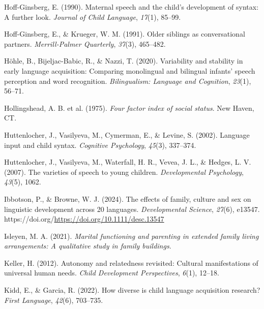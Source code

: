\documentclass[
  man,floatsintext]{apa6}
\newlength{\cslhangindent}
\newenvironment{CSLReferences}[2] %
 {\begin{list}{}{%
  \setlength{\itemindent}{0pt}
  \setlength{\leftmargin}{0pt}
  \setlength{\parsep}{0pt}
  \ifodd #1
   \setlength{\leftmargin}{\cslhangindent}
   \setlength{\itemindent}{-1\cslhangindent}
  \fi
  \setlength{\itemsep}{#2\baselineskip}}}
 {\end{list}}
\begin{document}
\begin{CSLReferences}{1}{0}
Hoff-Ginsberg, E. (1990). Maternal speech and the child's development of syntax: A further look. \emph{Journal of Child Language}, \emph{17}(1), 85--99.

Hoff-Ginsberg, E., \& Krueger, W. M. (1991). Older siblings as conversational partners. \emph{Merrill-Palmer Quarterly}, \emph{37}(3), 465--482.

Höhle, B., Bijeljac-Babic, R., \& Nazzi, T. (2020). Variability and stability in early language acquisition: Comparing monolingual and bilingual infants' speech perception and word recognition. \emph{Bilingualism: Language and Cognition}, \emph{23}(1), 56--71.

Hollingshead, A. B. et al. (1975). \emph{Four factor index of social status}. New Haven, CT.

Huttenlocher, J., Vasilyeva, M., Cymerman, E., \& Levine, S. (2002). Language input and child syntax. \emph{Cognitive Psychology}, \emph{45}(3), 337--374.

Huttenlocher, J., Vasilyeva, M., Waterfall, H. R., Vevea, J. L., \& Hedges, L. V. (2007). The varieties of speech to young children. \emph{Developmental Psychology}, \emph{43}(5), 1062.

Ibbotson, P., \& Browne, W. J. (2024). The effects of family, culture and sex on linguistic development across 20 languages. \emph{Developmental Science}, \emph{27}(6), e13547. https://doi.org/\href{\%20https://doi.org/10.1111/desc.13547}{https://doi.org/10.1111/desc.13547}

Isleyen, M. A. (2021). \emph{Marital functioning and parenting in extended family living arrangements: A qualitative study in family buildings}.

Keller, H. (2012). Autonomy and relatedness revisited: Cultural manifestations of universal human needs. \emph{Child Development Perspectives}, \emph{6}(1), 12--18.

Kidd, E., \& Garcia, R. (2022). How diverse is child language acquisition research? \emph{First Language}, \emph{42}(6), 703--735.


\end{CSLReferences}
\end{document}
